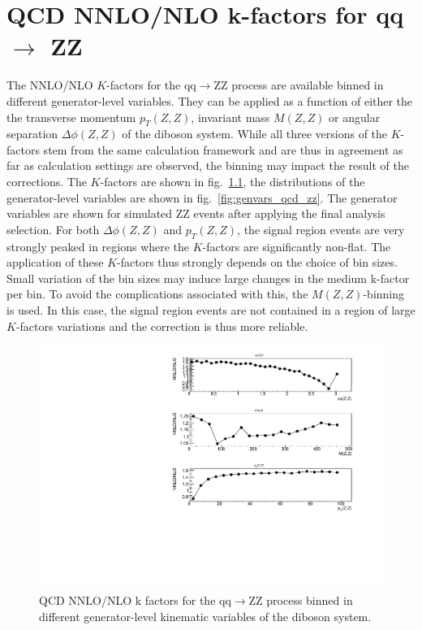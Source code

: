 \chapter{QCD NNLO/NLO k-factors for qq $\rightarrow$ ZZ}
\label{app:kfactor_qcd_zz}

The NNLO/NLO $K$-factors for the qq$\rightarrow$ZZ process are available binned in different generator-level variables.
They can be applied as a function of either the the transverse momentum $p_{T}(Z,Z)$,
invariant mass $M(Z,Z)$ or angular separation $\Delta\phi(Z,Z)$ of the diboson system.
While all three versions of the $K$-factors stem from the same calculation framework and are thus in agreement as far
as calculation settings are observed, the binning may impact the result of the corrections.
The $K$-factors are shown in fig.~\ref{fig:kfactor_qcd_zz}, the distributions of the generator-level variables are shown in fig.~\ref{fig:genvars_qcd_zz}.
The generator variables are shown for simulated ZZ events after applying the final analysis selection.
For both $\Delta\phi(Z,Z)$ and $p_{T}(Z,Z)$, the signal region events are very strongly peaked in regions where the $K$-factors are significantly non-flat.
The application of these $K$-factors thus strongly depends on the choice of bin sizes. Small variation of the bin sizes may induce large changes in the medium
k-factor per bin. To avoid the complications associated with this, the $M(Z,Z)$-binning is used. In this case, the signal region events are not contained in a
region of large $K$-factors variations and the correction is thus more reliable.

\begin{figure}[htbp]
\begin{center}
\includegraphics[width=\textwidth]{figures/kfactors.pdf}
\caption{QCD NNLO/NLO k factors for the qq$\rightarrow$ZZ process binned in different generator-level kinematic variables of the diboson system.
}
\label{fig:kfactor_qcd_zz}
\end{center}
\end{figure}

